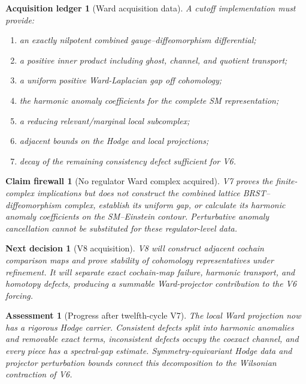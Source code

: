 \documentclass[11pt]{article}
\newtheorem{firewall}[theorem]{Claim firewall}
\newtheorem{decision}[theorem]{Next decision}
\newtheorem{assessment}[theorem]{Assessment}
\newtheorem{ledger}[theorem]{Acquisition ledger}
\theoremstyle{remark}
\begin{document}
\begin{ledger}[Ward acquisition data]
\label{led:v12v7-data}
A cutoff implementation must provide:
\begin{enumerate}
\item an exactly nilpotent combined gauge--diffeomorphism
      differential;
\item a positive inner product including ghost, channel, and quotient
      transport;
\item a uniform positive Ward-Laplacian gap off cohomology;
\item the harmonic anomaly coefficients for the complete SM
      representation;
\item a reducing relevant/marginal local subcomplex;
\item adjacent bounds on the Hodge and local projections;
\item decay of the remaining consistency defect sufficient for V6.
\end{enumerate}
\end{ledger}

\begin{firewall}[No regulator Ward complex acquired]
\label{fire:v12v7-boundary}
V7 proves the finite-complex implications but does not construct the
combined lattice BRST--diffeomorphism complex, establish its uniform
gap, or calculate its harmonic anomaly coefficients on the
SM--Einstein contour.  Perturbative anomaly cancellation cannot be
substituted for these regulator-level data.
\end{firewall}

\begin{decision}[V8 acquisition]
\label{dec:v12v7-next}
V8 will construct adjacent cochain comparison maps and prove
stability of cohomology representatives under refinement.  It will
separate exact cochain-map failure, harmonic transport, and homotopy
defects, producing a summable Ward-projector contribution to the V6
forcing.
\end{decision}

\begin{assessment}[Progress after twelfth-cycle V7]
\label{ass:v12v7-status}
The local Ward projection now has a rigorous Hodge carrier.
Consistent defects split into harmonic anomalies and removable exact
terms, inconsistent defects occupy the coexact channel, and every
piece has a spectral-gap estimate.  Symmetry-equivariant Hodge data
and projector perturbation bounds connect this decomposition to the
Wilsonian contraction of V6.
\end{assessment}
\end{document}
